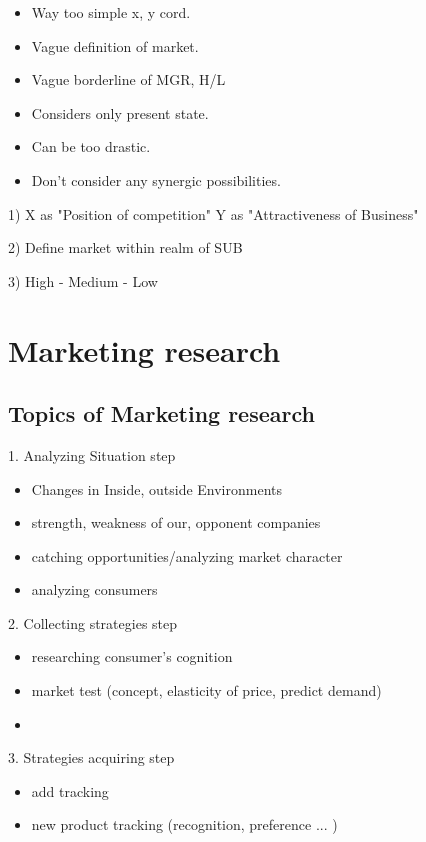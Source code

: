 \documentclass[12pt]{article}
\begin{document}
\begin{itemize}
  \item Way too simple x, y cord.
  \item Vague definition of market.
  \item Vague borderline of MGR, H/L
  \item Considers only present state.
  \item Can be too drastic.
  \item Don't consider any synergic possibilities.
\end{itemize}

1) X as "Position of competition" Y as "Attractiveness of Business"

2) Define market within realm of SUB

3) High - Medium - Low


\section{Marketing research}

\subsection{Topics of Marketing research}

1. Analyzing Situation step
\begin{itemize}
	\item Changes in Inside, outside Environments
	\item strength, weakness of our, opponent companies
	\item catching opportunities/analyzing market character
	\item analyzing consumers
\end{itemize}

2. Collecting strategies step
\begin{itemize}
	\item researching consumer's cognition
	\item market test (concept, elasticity of price, predict demand)
	\item
\end{itemize}

3. Strategies acquiring step
\begin{itemize}
	\item add tracking
	\item new product tracking (recognition, preference ... )
\end{itemize}
\end{document}
